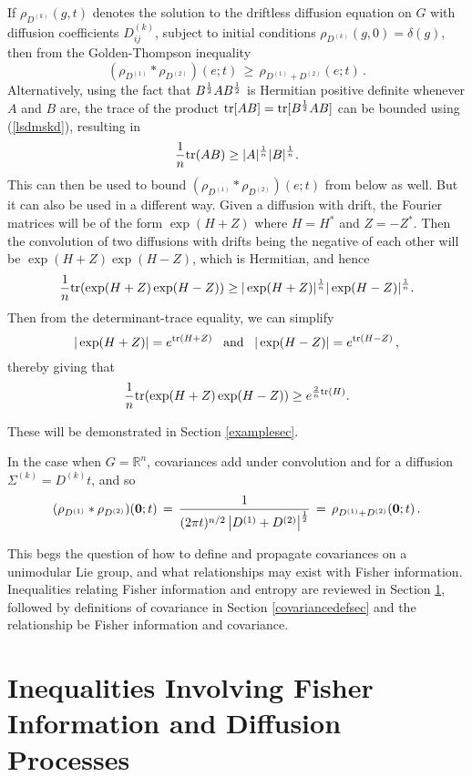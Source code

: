 \documentclass{svmult}
\def\half{ {1\over 2} }
\newcommand{\beq}{ \begin{equation}}
\newcommand{\eeq}{ \end{equation} }
\newcommand{\IR}{\mathbb{R}}
\begin{document}
If $\rho_{D^{(k)}}(g,t)$ denotes the solution to the driftless diffusion
equation on $G$ with diffusion coefficients $D_{ij}^{(k)}$, subject to initial
conditions $\rho_{D^{(k)}}(g,0)= \delta(g)$, then from the Golden-Thompson
inequality
\beq
(\rho_{D^{(1)}}*\rho_{D^{(2)}})(e;t) \,\geq\, \rho_{D^{(1)} + D^{(2)}}(e;t) \,.
\label{lsdmskd1234}
\eeq
Alternatively, using the fact that $B^{\half} A B^{\half}$ is Hermitian positive definite whenever $A$ and $B$ are,
the trace of the product ${\rm tr}[AB]  = {\rm tr}[B^{\half} A B]$ can be bounded using (\ref{lsdmskd}),
resulting in
\beq
\frac{1}{n} {\rm tr}(AB) \geq |A|^{\frac{1}{n}} |B|^{\frac{1}{n}}.
\label{lsdmskd12345}
\eeq
This can then be used to bound $(\rho_{D^{(1)}}*\rho_{D^{(2)}})(e;t)$ from below as well. But it can also be used
in a different way. Given a diffusion with drift, the Fourier matrices will be of the form
$\exp(H + Z)$ where $H=H^*$ and $Z=-Z^*$. Then the convolution of two diffusions with drifts being the negative
of each other will be $\exp(H + Z) \exp(H - Z)$, which is Hermitian, and hence
\beq
\frac{1}{n} {\rm tr}(\exp(H + Z) \exp(H - Z)) \geq |\exp(H + Z)|^{\frac{1}{n}} |\exp(H - Z)|^{\frac{1}{n}}.
\label{lsdmskd123456}
\eeq
Then from the determinant-trace equality, we can simplify
$$ |\exp(H + Z)| = e^{{\rm tr}(H + Z)} \,\,\,\,\,{\rm and}\,\,\,\,\,|\exp(H - Z)| = e^{{\rm tr}(H - Z)}\,,$$
thereby giving that
\beq
\frac{1}{n} {\rm tr}(\exp(H + Z) \exp(H - Z)) \geq e^{\frac{2}{n}{\rm tr}(H)}.
\label{lsdmskd1234567}
\eeq

These will be demonstrated in Section \ref{examplesec}.

In the case when $G = \IR^n$, covariances add under convolution and for a diffusion $\Sigma^{(k)} = D^{(k)} t$, and so
$$ (\rho_{D^{(1)}}*\rho_{D^{(2)}})({\bf 0};t) \,=\,
\frac{1}{(2\pi t)^{n/2} \left|D^{(1)} + D^{(2)}\right|^{\half} }
\,=\,
\rho_{D^{(1)} + D^{(2)}}({\bf 0};t) \,. $$

This begs the question of how to define and propagate covariances on a unimodular Lie group, and what relationships may exist with Fisher information. Inequalities relating Fisher information
and entropy are reviewed in Section \ref{fishdiff}, followed by definitions of covariance in
Section \ref{covariancedefsec} and the relationship be Fisher information and covariance.

\section{Inequalities Involving Fisher Information and Diffusion Processes} \label{fishdiff}
\end{document}
